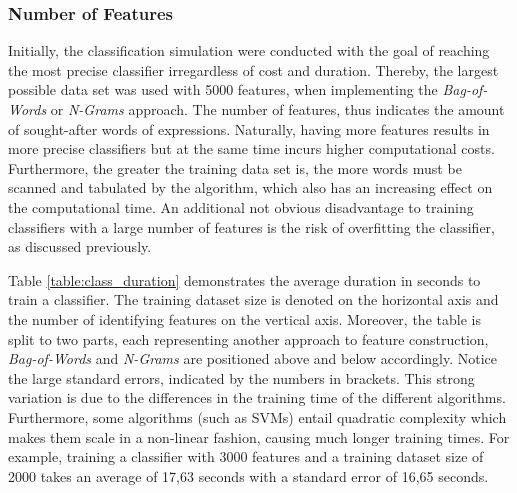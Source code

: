 		\subsubsection{Number of Features}
			Initially, the classification simulation were conducted with the goal of reaching the most precise classifier irregardless of cost and duration. Thereby, the largest possible data set was used with 5000 features, when implementing the \textit{Bag-of-Words} or \textit{N-Grams} approach. The number of features, thus indicates the amount of sought-after words of expressions. Naturally, having more features results in more precise classifiers but at the same time incurs higher computational costs. Furthermore, the greater the training data set is, the more words must be scanned and tabulated by the algorithm, which also has an increasing effect on the computational time. An additional not obvious disadvantage to training classifiers with a large number of features is the risk of overfitting the classifier, as discussed previously. 
			
			\par
			Table \ref{table:class_duration} demonstrates the average duration in seconds to train a classifier. The training dataset size is denoted on the horizontal axis and the number of identifying features on the vertical axis. Moreover, the table is split to two parts, each representing another approach to feature construction, \textit{Bag-of-Words} and \textit{N-Grams} are positioned above and below accordingly. Notice the large standard errors, indicated by the numbers in brackets. This strong variation is due to the differences in the training time of the different algorithms. Furthermore, some algorithms (such as SVMs) entail quadratic complexity which makes them scale in a non-linear fashion, causing much longer training times. For example, training a classifier with 3000 features and a training dataset size of 2000 takes an average of 17,63 seconds with a standard error of 16,65 seconds.
			
			\par
			
